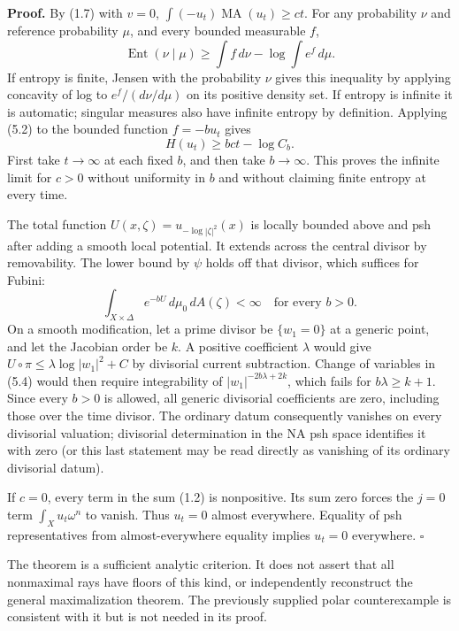 \documentclass[
  11pt,
]{article}
\begin{document}
\textbf{Proof.} By (1.7) with \(v=0\),
\(\int(-u_t)\operatorname{MA}(u_t)\geq ct\). For any probability \(\nu\)
and reference probability \(\mu\), and every bounded measurable \(f\),
\[
 \operatorname{Ent}(\nu\mid\mu)\geq\int f\,d\nu-\log\int e^f\,d\mu.
                                                               \tag{5.2}
\] If entropy is finite, Jensen with the probability \(\nu\) gives this
inequality by applying concavity of log to \(e^f/(d\nu/d\mu)\) on its
positive density set. If entropy is infinite it is automatic; singular
measures also have infinite entropy by definition. Applying (5.2) to the
bounded function \(f=-bu_t\) gives \[
 H(u_t)\geq bct-\log C_b.                                  \tag{5.3}
\] First take \(t\to\infty\) at each fixed \(b\), and then take
\(b\to\infty\). This proves the infinite limit for \(c>0\) without
uniformity in \(b\) and without claiming finite entropy at every time.

The total function \(U(x,\zeta)=u_{-\log|\zeta|^2}(x)\) is locally
bounded above and psh after adding a smooth local potential. It extends
across the central divisor by removability. The lower bound by \(\psi\)
holds off that divisor, which suffices for Fubini: \[
 \int_{X\times\Delta}e^{-bU}\,d\mu_0\,dA(\zeta)<\infty
                 \quad\text{for every }b>0.                 \tag{5.4}
\] On a smooth modification, let a prime divisor be \(\{w_1=0\}\) at a
generic point, and let the Jacobian order be \(k\). A positive
coefficient \(\lambda\) would give \(U\circ\pi\leq\lambda\log|w_1|^2+C\)
by divisorial current subtraction. Change of variables in (5.4) would
then require integrability of \(|w_1|^{-2b\lambda+2k}\), which fails for
\(b\lambda\geq k+1\). Since every \(b>0\) is allowed, all generic
divisorial coefficients are zero, including those over the time divisor.
The ordinary datum consequently vanishes on every divisorial valuation;
divisorial determination in the NA psh space identifies it with zero (or
this last statement may be read directly as vanishing of its ordinary
divisorial datum).

If \(c=0\), every term in the sum (1.2) is nonpositive. Its sum zero
forces the \(j=0\) term \(\int_Xu_t\omega^n\) to vanish. Thus \(u_t=0\)
almost everywhere. Equality of psh representatives from
almost-everywhere equality implies \(u_t=0\) everywhere. \(\square\)

The theorem is a sufficient analytic criterion. It does not assert that
all nonmaximal rays have floors of this kind, or independently
reconstruct the general maximalization theorem. The previously supplied
polar counterexample is consistent with it but is not needed in its
proof.
\end{document}
